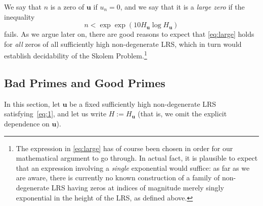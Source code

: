 \documentclass[preprint,12pt]{elsarticle}
\begin{document}
We say that $n$ is a zero of $\mathbf{u}$ if $u_n=0$, and 
we say that it is a  \emph{large zero} if the inequality 
\begin{equation}
\label{eq:large}
n<\exp \exp(10H_{\mathbf{u}}\log H_{\mathbf{u}})
\end{equation}
fails. As we argue later on, there are good reasons to expect that
\eqref{eq:large} holds for \emph{all} zeros of all sufficiently high non-degenerate LRS, which
in turn would establish decidability of the Skolem
Problem.\footnote{The expression in \eqref{eq:large} has
  of course been chosen in order for our mathematical argument to go
  through. In actual fact, it is plausible to expect that an
  expression involving a \emph{single}
  exponential would suffice: as far as we are aware, there is
  currently no known construction of a family of non-degenerate LRS
  having zeros at indices of magnitude merely singly exponential in
  the height of the LRS, as defined above.}

\subsection{Bad Primes and Good Primes}

In this section, let $\mathbf{u}$ be a fixed sufficiently high
non-degenerate LRS satisfying~\eqref{eq:1}, and let us write
$H:=H_{\mathbf{u}}$ (that is, we omit the explicit dependence on
$\mathbf{u}$).
\end{document}
